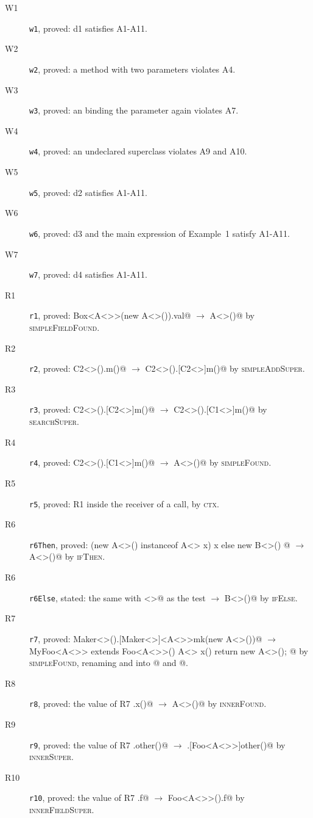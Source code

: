 \begin{description}
\item[W1] \texttt{w1}, proved: d1 satisfies A1-A11.
\item[W2] \texttt{w2}, proved: a method with two parameters \Q@x@ violates A4.
\item[W3] \texttt{w3}, proved: an \Q@if@ binding the parameter \Q@x@ again violates A7.
\item[W4] \texttt{w4}, proved: an undeclared superclass violates A9 and A10.
\item[W5] \texttt{w5}, proved: d2 satisfies A1-A11.
\item[W6] \texttt{w6}, proved: d3 and the main expression of Example~1 satisfy A1-A11.
\item[W7] \texttt{w7}, proved: d4 satisfies A1-A11.
\item[R1] \texttt{r1}, proved: \Q@new Box<A<>>(new A<>()).val@ $\rightarrow$ \Q@new A<>()@ by \textsc{simpleFieldFound}.
\item[R2] \texttt{r2}, proved: \Q@new C2<>().m()@ $\rightarrow$ \Q@new C2<>().[C2<>]m()@ by \textsc{simpleAddSuper}.
\item[R3] \texttt{r3}, proved: \Q@new C2<>().[C2<>]m()@ $\rightarrow$ \Q@new C2<>().[C1<>]m()@ by \textsc{searchSuper}.
\item[R4] \texttt{r4}, proved: \Q@new C2<>().[C1<>]m()@ $\rightarrow$ \Q@new A<>()@ by \textsc{simpleFound}.
\item[R5] \texttt{r5}, proved: R1 inside the receiver of a call, by \textsc{ctx}.
\item[R6] \texttt{r6Then}, proved: \Q@if (new A<>() instanceof A<> x){ x } else { new B<>() }@ $\rightarrow$ \Q@new A<>()@ by \textsc{ifThen}.
\item[R6] \texttt{r6Else}, stated: the same with \Q@B<>@ as the test $\rightarrow$ \Q@new B<>()@ by \textsc{ifElse}.
\item[R7] \texttt{r7}, proved: \Q@new Maker<>().[Maker<>]<A<>>mk(new A<>())@ $\rightarrow$ \Q@new MyFoo<A<>> extends Foo<A<>>(){ A<> x(){ return new A<>(); } }@ by \textsc{simpleFound}, renaming \Q@Y@ and \Q@y@ into @ and @.
\item[R8] \texttt{r8}, proved: the value of R7 \Q@.x()@ $\rightarrow$ \Q@new A<>()@ by \textsc{innerFound}.
\item[R9] \texttt{r9}, proved: the value of R7 \Q@.other()@ $\rightarrow$ \Q@.[Foo<A<>>]other()@ by \textsc{innerSuper}.
\item[R10] \texttt{r10}, proved: the value of R7 \Q@.f@ $\rightarrow$ \Q@new Foo<A<>>().f@ by \textsc{innerFieldSuper}.

\end{description}
